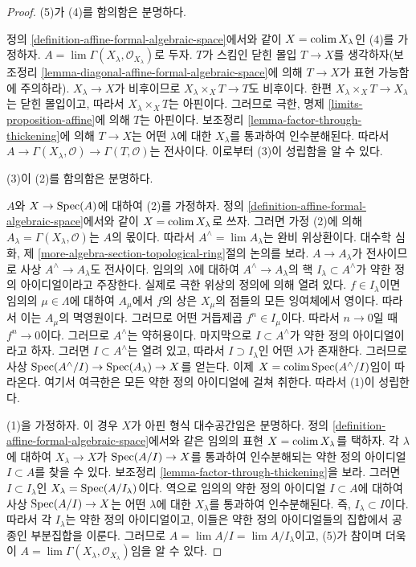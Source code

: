 \begin{proof}
(5)가 (4)를 함의함은 분명하다.

\medskip\noindent
정의 \ref{definition-affine-formal-algebraic-space}에서와 같이
$X = \mathop{\mathrm{colim}}\nolimits X_\lambda$인 (4)를 가정하자.
$A = \lim \Gamma(X_\lambda, \mathcal{O}_{X_\lambda})$로 두자.
$T$가 스킴인 닫힌 몰입 $T \to X$를 생각하자(보조정리
\ref{lemma-diagonal-affine-formal-algebraic-space}에 의해
$T \to X$가 표현 가능함에 주의하라). $X_\lambda \to X$가 비후이므로
$X_\lambda \times_X T \to T$도 비후이다. 한편
$X_\lambda \times_X T \to X_\lambda$는 닫힌 몰입이고, 따라서
$X_\lambda \times_X T$는 아핀이다. 그러므로 극한, 명제
\ref{limits-proposition-affine}에 의해 $T$는 아핀이다. 보조정리
\ref{lemma-factor-through-thickening}에 의해 $T \to X$는 어떤
$\lambda$에 대한 $X_\lambda$를 통과하여 인수분해된다. 따라서
$A \to \Gamma(X_\lambda, \mathcal{O}) \to \Gamma(T, \mathcal{O})$는
전사이다. 이로부터 (3)이 성립함을 알 수 있다.

\medskip\noindent
(3)이 (2)를 함의함은 분명하다.

\medskip\noindent
$A$와 $X \to \mathop{\mathrm{Spec}}(A)$에 대하여 (2)를 가정하자. 정의
\ref{definition-affine-formal-algebraic-space}에서와 같이
$X = \mathop{\mathrm{colim}}\nolimits X_\lambda$로 쓰자. 그러면 가정 (2)에 의해
$A_\lambda = \Gamma(X_\lambda, \mathcal{O})$는 $A$의 몫이다. 따라서
$A^\wedge = \lim A_\lambda$는 완비 위상환이다. 대수학 심화, 제
\ref{more-algebra-section-topological-ring}절의 논의를 보라.
$A \to A_\lambda$가 전사이므로 사상
$A^\wedge \to A_\lambda$도 전사이다. 임의의 $\lambda$에 대하여
$A^\wedge \to A_\lambda$의 핵 $I_\lambda \subset A^\wedge$가 약한
정의 아이디얼이라고 주장한다. 실제로 극한 위상의 정의에 의해
열려 있다. $f \in I_\lambda$이면 임의의 $\mu \in \Lambda$에 대하여
$A_\mu$에서 $f$의 상은 $X_\mu$의 점들의 모든 잉여체에서 영이다.
따라서 이는 $A_\mu$의 멱영원이다. 그러므로 어떤 거듭제곱
$f^n \in I_\mu$이다. 따라서
$n \to 0$일 때 $f^n \to 0$이다. 그러므로 $A^\wedge$는 약허용이다.
마지막으로 $I \subset A^\wedge$가 약한 정의 아이디얼이라고 하자.
그러면 $I \subset A^\wedge$는 열려 있고, 따라서
$I \supset I_\lambda$인 어떤 $\lambda$가 존재한다. 그러므로 사상
$\mathop{\mathrm{Spec}}(A^\wedge/I) \to \mathop{\mathrm{Spec}}(A_\lambda) \to X$를 얻는다. 이제
$X = \mathop{\mathrm{colim}}\nolimits \mathop{\mathrm{Spec}}(A^\wedge/I)$임이 따라온다. 여기서 여극한은 모든
약한 정의 아이디얼에 걸쳐 취한다. 따라서 (1)이 성립한다.

\medskip\noindent
(1)을 가정하자. 이 경우 $X$가 아핀 형식 대수공간임은 분명하다.
정의 \ref{definition-affine-formal-algebraic-space}에서와 같은 임의의
표현 $X = \mathop{\mathrm{colim}}\nolimits X_\lambda$를 택하자. 각 $\lambda$에 대하여
$X_\lambda \to X$가 $\mathop{\mathrm{Spec}}(A/I) \to X$를 통과하여 인수분해되는
약한 정의 아이디얼 $I \subset A$를 찾을 수 있다. 보조정리
\ref{lemma-factor-through-thickening}을 보라. 그러면
$I \subset I_\lambda$인 $X_\lambda = \mathop{\mathrm{Spec}}(A/I_\lambda)$이다. 역으로
임의의 약한 정의 아이디얼 $I \subset A$에 대하여 사상
$\mathop{\mathrm{Spec}}(A/I) \to X$는 어떤 $\lambda$에 대한 $X_\lambda$를 통과하여
인수분해된다. 즉, $I_\lambda \subset I$이다. 따라서 각
$I_\lambda$는 약한 정의 아이디얼이고, 이들은 약한 정의 아이디얼들의
집합에서 공종인 부분집합을 이룬다. 그러므로
$A = \lim A/I = \lim A/I_\lambda$이고, (5)가 참이며 더욱이
$A = \lim \Gamma(X_\lambda, \mathcal{O}_{X_\lambda})$임을 알 수 있다.
\end{proof}

